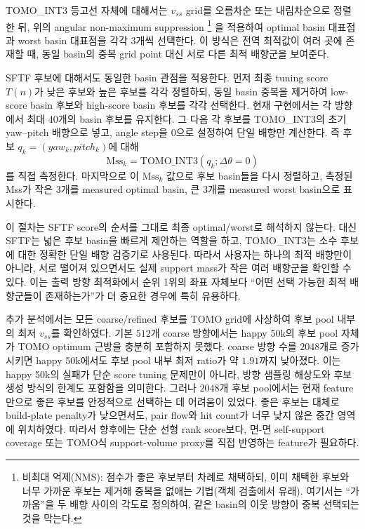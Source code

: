 \documentclass[11pt,a4paper]{article}
\begin{document}
TOMO\_INT3 등고선 자체에 대해서는 $v_{ss}$ grid를 오름차순 또는 내림차순으로 정렬한 뒤,
위의 angular non-maximum suppression%
\footnote{비최대 억제(NMS): 점수가 좋은 후보부터 차례로 채택하되, 이미 채택한 후보와 너무 가까운
후보는 제거해 중복을 없애는 기법(객체 검출에서 유래). 여기서는 ``가까움''을 두 배향 사이의
각도로 정의하여, 같은 basin의 이웃 방향이 중복 선택되는 것을 막는다.}
을 적용하여
optimal basin 대표점과 worst basin 대표점을 각각 3개씩 선택한다.
이 방식은 전역 최적값이 여러 곳에 존재할 때,
동일 basin의 중복 grid point 대신 서로 다른 최적 배향군을 보여준다.

SFTF 후보에 대해서도 동일한 basin 관점을 적용한다.
먼저 최종 tuning score $T(n)$가 낮은 후보와 높은 후보를 각각 정렬하되,
동일 basin 중복을 제거하여 low-score basin 후보와 high-score basin 후보를 각각 선택한다.
현재 구현에서는 각 방향에서 최대 40개의 basin 후보를 유지한다.
그 다음 각 후보를 TOMO\_INT3의 초기 yaw--pitch 배향으로 넣고,
angle step을 0으로 설정하여 단일 배향만 계산한다.
즉 후보 $q_k=(yaw_k,pitch_k)$에 대해
\begin{equation}
\mathrm{Mss}_k
=
\mathrm{TOMO\_INT3}(q_k;\Delta\theta=0)
\end{equation}
를 직접 측정한다.
마지막으로 이 $\mathrm{Mss}_k$ 값으로 후보 basin들을 다시 정렬하고,
측정된 Mss가 작은 3개를 measured optimal basin,
큰 3개를 measured worst basin으로 표시한다.

이 절차는 SFTF score의 순서를 그대로 최종 optimal/worst로 해석하지 않는다.
대신 SFTF는 넓은 후보 basin을 빠르게 제안하는 역할을 하고,
TOMO\_INT3는 소수 후보에 대한 정확한 단일 배향 검증기로 사용된다.
따라서 사용자는 하나의 최적 배향만이 아니라,
서로 떨어져 있으면서도 실제 support mass가 작은 여러 배향군을 확인할 수 있다.
이는 출력 방향 최적화에서 순위 1위의 좌표 자체보다
``어떤 선택 가능한 최적 배향군들이 존재하는가''가 더 중요한 경우에 특히 유용하다.

추가 분석에서는 모든 coarse/refined 후보를 TOMO grid에 사상하여 후보 pool 내부의 최저 $v_{ss}$를 확인하였다.
기본 $512$개 coarse 방향에서는 happy 50k의 후보 pool 자체가 TOMO optimum 근방을 충분히 포함하지 못했다.
coarse 방향 수를 $2048$개로 증가시키면 happy 50k에서도 후보 pool 내부 최저 ratio가 약 $1.91$까지 낮아졌다.
이는 happy 50k의 실패가 단순 score tuning 문제만이 아니라,
방향 샘플링 해상도와 후보 생성 방식의 한계도 포함함을 의미한다.
그러나 $2048$개 후보 pool에서는 현재 feature만으로 좋은 후보를 안정적으로 선택하는 데 어려움이 있었다.
좋은 후보는 대체로 build-plate penalty가 낮으면서도,
pair flow와 hit count가 너무 낮지 않은 중간 영역에 위치하였다.
따라서 향후에는 단순 선형 rank score보다,
면-면 self-support coverage 또는 TOMO식 support-volume proxy를 직접 반영하는 feature가 필요하다.
\end{document}
